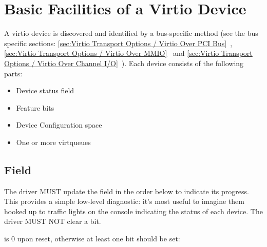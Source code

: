 \chapter{Basic Facilities of a Virtio Device}\label{sec:Basic Facilities of a Virtio Device}

A virtio device is discovered and identified by a bus-specific method
(see the bus specific sections: \ref{sec:Virtio Transport Options / Virtio Over PCI Bus}~,
\ref{sec:Virtio Transport Options / Virtio Over MMIO}~ and \ref{sec:Virtio Transport Options / Virtio Over Channel I/O}~).  Each
device consists of the following parts:

\begin{itemize}
\item Device status field
\item Feature bits
\item Device Configuration space
\item One or more virtqueues
\end{itemize}

\section{ Field}\label{sec:Basic Facilities of a Virtio Device / Device Status Field}

The driver MUST update the  field in the order below to
indicate its progress. This provides a simple low-level diagnostic:
it's most useful to imagine them hooked up to traffic lights on the
console indicating the status of each device.  The driver MUST NOT
clear a  bit.

 is 0 upon reset, otherwise at least one bit should be set:

